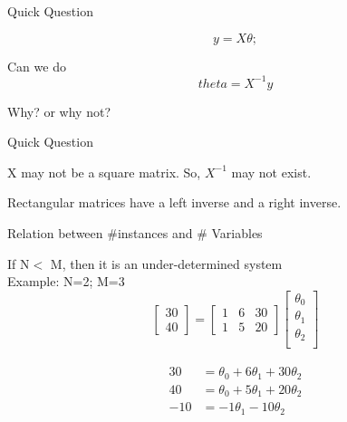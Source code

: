 \documentclass{beamer}
\begin{document}
\begin{frame}{Quick Question}
    
    $$
    y = X\theta;
    $$
    
    Can we do
    $$theta = X^{-1}y$$
    
    Why? or why not?
    
\end{frame}


\begin{frame}{Quick Question}

    X may not be a square matrix. So, $X^{-1}$ may not exist.
    
    Rectangular matrices have a left inverse and a right inverse.
\end{frame}



\begin{frame}{Relation between \#instances and \# Variables}
    
    If N$<$ M, then it is an under-determined system\\
    Example: N=2; M=3\\
 
   $$ \begin{bmatrix}
        30 \\
        40 
    \end{bmatrix}
     = \begin{bmatrix}
         1 & 6& 30\\
         1 & 5& 20
     \end{bmatrix}    \begin{bmatrix}
        \theta_{0}\\
        \theta_{1}\\
        \theta_{2}\\
    \end{bmatrix} $$
 
    
    
    \begin{align}
\label{eqn*:eqlabel}
\begin{split}
   30 &= \theta_{0} + 6\theta_{1} + 30\theta_{2} \\
40 &= \theta_{0} + 5\theta_{1} + 20\theta_{2}\\
\hline
-10 &=  -1 \theta_{1} -10\theta_{2}
\end{split}
\end{align}

    
        
        

\end{frame}
\end{document}
